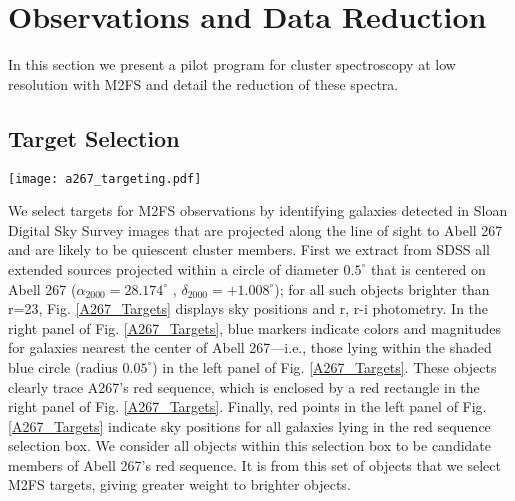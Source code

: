 \documentclass[twocolumn]{aastex6}
\begin{document}
\section{Observations and Data Reduction}
\label{observations}
In this section we present a pilot program for cluster spectroscopy at low resolution with M2FS and detail the reduction of these spectra.
\subsection{Target Selection}
\label{TargetSelection}
\begin{figure*}
\centering
\texttt{[image: a267\_targeting.pdf]}
\caption{Equatorial coordinates (left) and $r$, $r-i$ photometry (right) for galaxies along the line of sight to Abell 267 \citep[SDSS DR12,][]{SDSSDR12}.  In the right-hand panel, blue markers represent galaxies nearest the center of Abell 267 (from within the shaded blue circle in the left-hand panel).  The red rectangle encloses quiescent galaxies on Abell 267's red sequence.  In the left-hand panel, red points show the spatial distribution of these red sequence candidates; it is from this set of objects that we select M2FS targets.  In the left-hand panel, the shaded gray circle represent the M2FS field of view.}
\label{A267_Targets}
\end{figure*}

We select targets for M2FS observations by identifying galaxies detected in Sloan Digital Sky Survey images \citep[Data Release 12,][]{SDSSDR12} that are projected along the line of sight to Abell 267 and are likely to be quiescent cluster members.
First we extract from SDSS all extended sources projected within a circle of diameter $0.5^\circ$ that is centered on Abell 267 ($\alpha_{2000}=28.174^{\circ}$ , $\delta_{2000}=+1.008^{\circ}$); for all such objects brighter than r=23, Fig. \ref{A267_Targets} displays sky positions and r, r-i photometry.
In the right panel of Fig. \ref{A267_Targets}, blue markers indicate colors and magnitudes for galaxies nearest the center of Abell 267---i.e., those lying within the shaded blue circle (radius $0.05^\circ$) in the left panel of Fig. \ref{A267_Targets}.
These objects clearly trace A267's red sequence, which is enclosed by a red rectangle in the right panel of Fig. \ref{A267_Targets}.
Finally, red points in the left panel of Fig. \ref{A267_Targets} indicate sky positions for all galaxies lying in the red sequence selection box.
We consider all objects within this selection box to be candidate members of Abell 267's red sequence.
It is from this set of objects that we select M2FS targets, giving greater weight to brighter objects.
\end{document}
